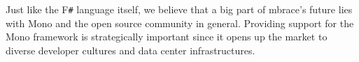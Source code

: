 \documentclass[9pt,a4paper]{article}
\newcommand{\mbrace}{mbrace}
\newcommand{\fsharp}{F\texttt \#}
\begin{document}
Just like the \fsharp{} language itself, we believe that a big part of \mbrace{}'s 
future lies with Mono and the open source community in general. Providing support
for the Mono framework is strategically important since it opens up the market
to diverse developer cultures and data center infrastructures.




%
%
%

%
%
\end{document}
